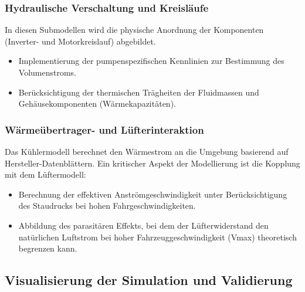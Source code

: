 \subsubsection{Hydraulische Verschaltung und Kreisläufe}
In diesen Submodellen wird die physische Anordnung der Komponenten (Inverter- und Motorkreislauf) abgebildet. 
\begin{itemize}
    \item Implementierung der pumpenspezifischen Kennlinien zur Bestimmung des Volumenstroms.
    \item Berücksichtigung der thermischen Trägheiten der Fluidmassen und Gehäusekomponenten (Wärmekapazitäten).
\end{itemize}

\subsubsection{Wärmeübertrager- und Lüfterinteraktion}
Das Kühlermodell berechnet den Wärmestrom an die Umgebung basierend auf Hersteller-Datenblättern. Ein kritischer Aspekt der Modellierung ist die Kopplung mit dem Lüftermodell:
\begin{itemize}
    \item Berechnung der effektiven Anströmgeschwindigkeit unter Berücksichtigung des Staudrucks bei hohen Fahrgeschwindigkeiten.
    \item Abbildung des parasitären Effekts, bei dem der Lüfterwiderstand den natürlichen Luftstrom bei hoher Fahrzeuggeschwindigkeit (Vmax) theoretisch begrenzen kann.
\end{itemize}

\subsection{Visualisierung der Simulation und Validierung}
